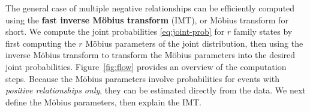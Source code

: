 \documentclass[oribibl]{llncs}
\begin{document}
%


The general case of multiple negative relationships can be efficiently computed using
the \textbf{fast inverse M\"obius transform} (IMT), or M\"obius transform for short. 
We compute the  joint probabilities \eqref{eq:joint-prob} for $r$ family states by first computing the $r$  M\"obius parameters of the joint distribution, then using the inverse M\"obius transform to transform the M\"obius parameters into the desired joint probabilities. Figure~\ref{fig:flow} provides an overview of the computation steps. Because the M\"obius parameters involve probabilities  for events with {\em positive relationships only}, they can be estimated directly from the data. 
We next define the M\"obius parameters, then explain the IMT.
\end{document}
